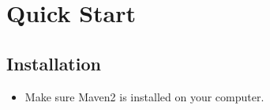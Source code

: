\chapter{Quick Start}
\label{cha:QuickStart}

\section{Installation}

\begin{itemize}

  \item Make sure Maven2 is installed on your computer.
  
  

\end{itemize} 

